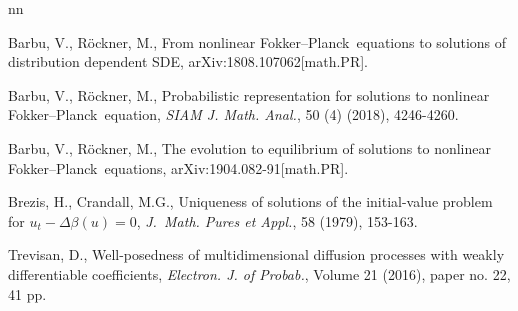 \documentclass[12pt]{article}
\def\D{{\Delta}}
\def\D{{\Delta}}
\def\FP{Fokker--Planck}
\theoremstyle{definition}
\def\b{{\beta}}
\def\D{{\Delta}}
\begin{document}
\begin{thebibliography}{nn}
	
	 Barbu, V., R\"ockner, M., From nonlinear \FP\ equations to solutions of distribution dependent SDE, arXiv:1808.107062[math.PR].\vspace*{-2mm}  
	
	
	  Barbu, V., R\"ockner, M., Probabilistic representation for solutions to nonlinear \FP\ equation, {\it SIAM J. Math. Anal.}, 50 (4) (2018), 4246-4260.\vspace*{-2mm}  
	
	 Barbu, V., R\"ockner, M., The evolution to equilibrium of solutions to nonlinear \FP\ equations, arXiv:1904.082-91[math.PR].\vspace*{-2mm}     
	
	   Brezis, H., Crandall, M.G., Uniqueness of solutions of the initial-value problem for $u_t-\D\b(u)=0$, {\it J.~Math. Pures et Appl.}, 58 (1979), 153-163.\vspace*{-2mm}    	
	
	 Trevisan, D., Well-posedness of multidimensional diffusion processes with weakly differentiable coefficients, {\it Electron. J. of Probab.}, Volume 21 (2016), paper no. 22, 41 pp.
	  
\end{thebibliography}
\end{document}

